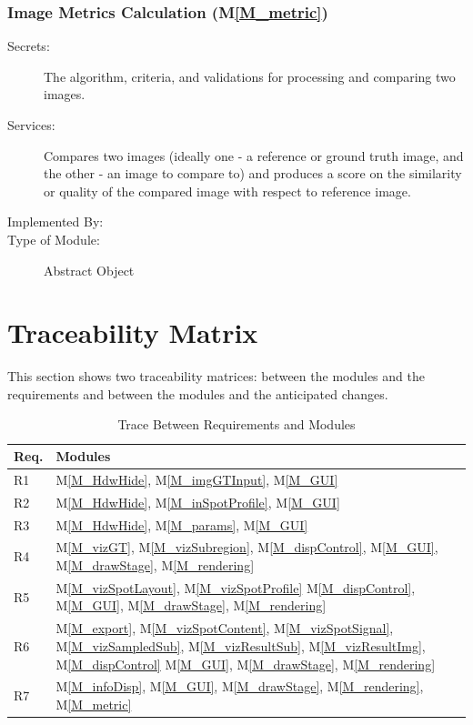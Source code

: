 \documentclass[12pt, titlepage]{article}
\newcommand{\mref}[1]{M\ref{#1}}
\begin{document}
\subsubsection{Image Metrics Calculation (\mref{M_metric})}
\begin{description}
\item[Secrets:] The algorithm, criteria, and validations for processing and comparing two images.
\item[Services:] Compares two images (ideally one - a reference or ground truth image, 
  and the other - an image to compare to) and produces a score on the 
  similarity or quality of the compared image with respect to reference image.
\item[Implemented By:] \progname{}
\item[Type of Module:] Abstract Object
\end{description}



\section{Traceability Matrix} \label{SecTM}

This section shows two traceability matrices: between the modules and the
requirements and between the modules and the anticipated changes.

\begin{table}[H]
\centering
\begin{tabular}{p{} p{}}
\toprule
\textbf{Req.} & \textbf{Modules}\\
\midrule
R1 & \mref{M_HdwHide}, \mref{M_imgGTInput}, \mref{M_GUI}\\
R2 & \mref{M_HdwHide}, \mref{M_inSpotProfile}, \mref{M_GUI}\\
R3 & \mref{M_HdwHide}, \mref{M_params}, \mref{M_GUI}\\
R4 & \mref{M_vizGT}, \mref{M_vizSubregion}, \mref{M_dispControl}, \mref{M_GUI}, \mref{M_drawStage}, \mref{M_rendering}\\
R5 & \mref{M_vizSpotLayout}, \mref{M_vizSpotProfile} \mref{M_dispControl}, \mref{M_GUI}, \mref{M_drawStage}, \mref{M_rendering}\\
R6 & \mref{M_export}, \mref{M_vizSpotContent}, \mref{M_vizSpotSignal}, \mref{M_vizSampledSub}, \mref{M_vizResultSub}, \mref{M_vizResultImg}, \mref{M_dispControl} \mref{M_GUI}, \mref{M_drawStage}, \mref{M_rendering}\\
R7 & \mref{M_infoDisp}, \mref{M_GUI}, \mref{M_drawStage}, \mref{M_rendering}, \mref{M_metric}\\
\bottomrule
\end{tabular}
\caption{Trace Between Requirements and Modules}
\label{TblRT}
\end{table}
\end{document}
